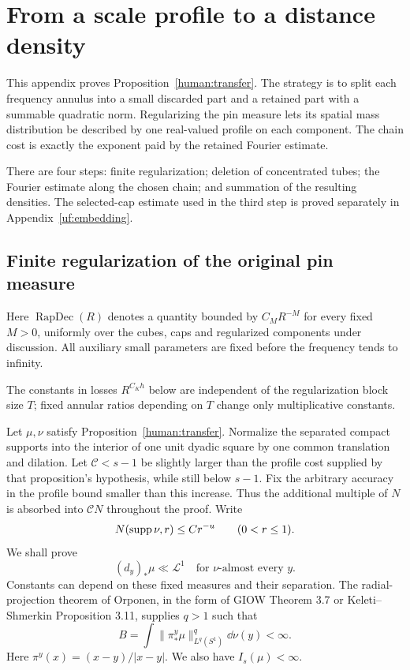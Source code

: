 \section{From a scale profile to a distance density}
\label{human:analytic-proof}

This appendix proves Proposition~\ref{human:transfer}. The strategy is to
split each frequency annulus into a small discarded part and a retained part
with a summable quadratic norm. Regularizing the pin measure lets its spatial
mass distribution be described by one real-valued profile on each component.
The chain cost is exactly the exponent paid by the retained Fourier estimate.

There are four steps: finite regularization; deletion of concentrated tubes;
the Fourier estimate along the chosen chain; and summation of the resulting
densities. The selected-cap estimate used in the third step is proved
separately in Appendix~\ref{uf:embedding}.

\subsection{Finite regularization of the original pin measure}

Here \(\operatorname{RapDec}(R)\) denotes a quantity bounded by
\(C_M R^{-M}\) for every fixed \(M>0\), uniformly over the cubes,
caps and regularized components under discussion. All auxiliary small
parameters are fixed before the frequency tends to infinity.

The constants in losses \(R^{C_Kh}\) below are independent of the
regularization block size \(T\); fixed annular ratios depending on
\(T\) change only multiplicative constants.

Let \(\mu,\nu\) satisfy Proposition~\ref{human:transfer}.
Normalize the separated compact supports into the interior of one unit
dyadic square by one common translation and dilation. Let \(\mathcal C<s-1\)
be slightly larger than the profile cost supplied by that proposition's
hypothesis, while still below \(s-1\). Fix the arbitrary accuracy in the
profile bound smaller than this increase. Thus the additional multiple of
\(N\) is absorbed into \(\mathcal C N\) throughout the proof. Write
\begin{equation}\label{fprof:cover}
 N(\operatorname{supp}\nu,r)\le Cr^{-u}\qquad(0<r\le1).
\end{equation}
We shall prove
\begin{equation}\label{fprof:ac}
 (d_y)_*\mu\ll\mathcal L^1\quad\text{for \(\nu\)-almost every }y.
\end{equation}
Constants can depend on these fixed measures and their separation. The radial-projection theorem of Orponen, in the form of GIOW Theorem 3.7 or Keleti--Shmerkin Proposition 3.11, supplies \(q>1\) such that
\begin{equation}\label{fprof:radial}
 B=\int\|\pi^y_*\mu\|_{L^q(S^1)}^q\dd\nu(y)<\infty.
\end{equation}
Here \(\pi^y(x)=(x-y)/|x-y|\). We also have \(I_s(\mu)<\infty\).

